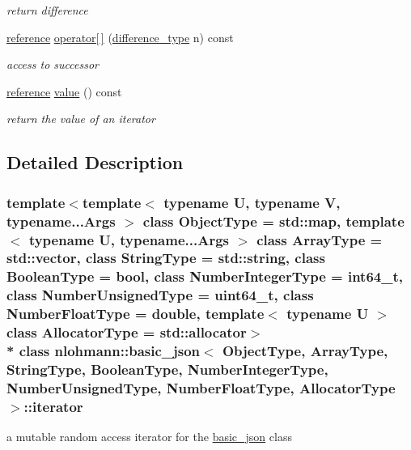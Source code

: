 \begin{DoxyCompactItemize}
\begin{DoxyCompactList}\small\item\em return difference \end{DoxyCompactList}\item 
\hyperlink{a00038_aefd248cac6493eed1e6ff53ba6a63eb2}{reference} \hyperlink{a00079_a7e01532727c10f87926dac4eb8e170f4}{operator\mbox{[}$\,$\mbox{]}} (\hyperlink{a00038_a49d7c3e9ef3280df03052cce988b792f}{difference\+\_\+type} n) const \hypertarget{a00079_a7e01532727c10f87926dac4eb8e170f4}{}\label{a00079_a7e01532727c10f87926dac4eb8e170f4}

\begin{DoxyCompactList}\small\item\em access to successor \end{DoxyCompactList}\item 
\hyperlink{a00038_aefd248cac6493eed1e6ff53ba6a63eb2}{reference} \hyperlink{a00079_a8ffbf287736048e683f58306fdb8701f}{value} () const \hypertarget{a00079_a8ffbf287736048e683f58306fdb8701f}{}\label{a00079_a8ffbf287736048e683f58306fdb8701f}

\begin{DoxyCompactList}\small\item\em return the value of an iterator \end{DoxyCompactList}\end{DoxyCompactItemize}


\subsection{Detailed Description}
\subsubsection*{template$<$template$<$ typename U, typename V, typename...\+Args $>$ class Object\+Type = std\+::map, template$<$ typename U, typename...\+Args $>$ class Array\+Type = std\+::vector, class String\+Type = std\+::string, class Boolean\+Type = bool, class Number\+Integer\+Type = int64\+\_\+t, class Number\+Unsigned\+Type = uint64\+\_\+t, class Number\+Float\+Type = double, template$<$ typename U $>$ class Allocator\+Type = std\+::allocator$>$\\*
class nlohmann\+::basic\+\_\+json$<$ Object\+Type, Array\+Type, String\+Type, Boolean\+Type, Number\+Integer\+Type, Number\+Unsigned\+Type, Number\+Float\+Type, Allocator\+Type $>$\+::iterator}

a mutable random access iterator for the \hyperlink{a00025}{basic\+\_\+json} class 

